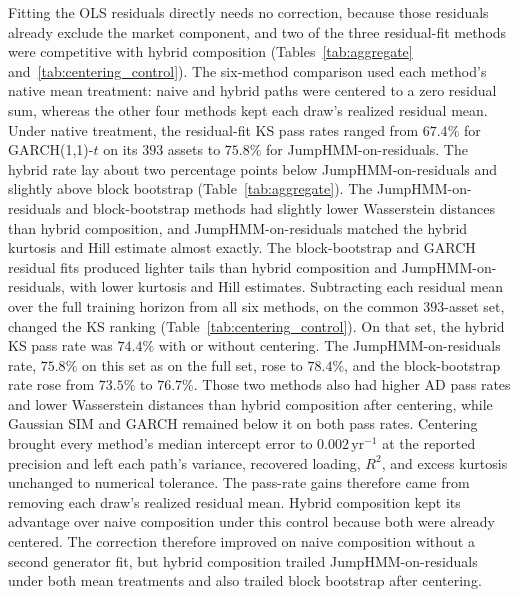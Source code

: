 Fitting the OLS residuals directly needs no correction, because those
residuals already exclude the market component, and two of the three
residual-fit methods were competitive with hybrid composition
(Tables~\ref{tab:aggregate} and~\ref{tab:centering_control}). The
six-method comparison used each method's native mean treatment: naive
and hybrid paths were centered to a zero residual sum, whereas the
other four methods kept each draw's realized residual mean. Under
native treatment, the residual-fit KS pass rates ranged from $67.4\%$
for GARCH(1,1)-$t$ on its $393$ assets to $75.8\%$ for
JumpHMM-on-residuals. The hybrid rate lay about two percentage points
below JumpHMM-on-residuals and slightly above block bootstrap
(Table~\ref{tab:aggregate}). The JumpHMM-on-residuals and
block-bootstrap methods had slightly lower Wasserstein distances than
hybrid composition, and JumpHMM-on-residuals matched the hybrid
kurtosis and Hill estimate almost exactly. The block-bootstrap and
GARCH residual fits produced lighter tails than hybrid composition and
JumpHMM-on-residuals, with lower kurtosis and Hill estimates.
Subtracting each residual mean over the full training horizon from all
six methods, on the common $393$-asset set, changed the KS ranking
(Table~\ref{tab:centering_control}). On that set, the hybrid KS pass
rate was $74.4\%$ with or without centering. The JumpHMM-on-residuals
rate, $75.8\%$ on this set as on the full set, rose to $78.4\%$, and
the block-bootstrap rate rose from $73.5\%$ to $76.7\%$. Those two
methods also had higher AD pass rates and lower Wasserstein distances
than hybrid composition after centering, while Gaussian SIM and GARCH
remained below it on both pass rates. Centering brought every method's
median intercept error to $0.002\,\mathrm{yr}^{-1}$ at the reported
precision and left each path's variance, recovered loading, $R^2$, and
excess kurtosis unchanged to numerical tolerance. The pass-rate gains
therefore came from removing each draw's realized residual mean. Hybrid
composition kept its advantage over naive composition under this
control because both were already centered. The correction therefore improved on naive composition without a
second generator fit, but hybrid composition trailed
JumpHMM-on-residuals under both mean treatments and also trailed block
bootstrap after centering.


